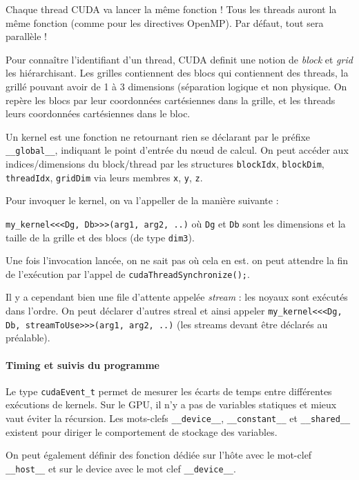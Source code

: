 \documentclass{article}
\begin{document}
Chaque thread CUDA va lancer la même fonction ! Tous les threads auront la même fonction (comme pour les directives OpenMP). Par défaut, tout sera parallèle !

Pour connaître l'identifiant d'un thread, CUDA definit une notion de \emph{block} et \emph{grid} les hiérarchisant. Les grilles contiennent des blocs qui contiennent des threads, la grillé pouvant avoir de 1 à 3 dimensions (séparation logique et non physique. On repère les blocs par leur coordonnées cartésiennes dans la grille, et les threads leurs coordonnées cartésiennes dans le bloc.

Un kernel est une fonction ne retournant rien se déclarant par le préfixe \texttt{\_\_global\_\_}, indiquant le point d'entrée du nœud de calcul. On peut accéder aux indices/dimensions du block/thread par les structures \texttt{blockIdx}, \texttt{blockDim}, \texttt{threadIdx}, \texttt{gridDim} via leurs membres \texttt{x}, \texttt{y}, \texttt{z}.

Pour invoquer le kernel, on va l'appeller de la manière suivante :

\texttt{my\_kernel<<<Dg, Db>>>(arg1, arg2, ..)} où \texttt{Dg} et \texttt{Db} sont les dimensions et la taille de la grille et des blocs (de type \texttt{dim3}).

Une fois l'invocation lancée, on ne sait pas où cela en est. on peut attendre la fin de l'exécution par l'appel de \texttt{cudaThreadSynchronize();}.

Il y a cependant bien une file d'attente appelée \emph{stream} : les noyaux sont exécutés dans l'ordre. On peut déclarer d'autres streal et ainsi appeler \texttt{my\_kernel<<<Dg, Db, streamToUse>>>(arg1, arg2, ..)} (les streams devant être déclarés au préalable).

\paragraph{Timing et suivis du programme}
Le type \texttt{cudaEvent\_t} permet de mesurer les écarts de temps entre différentes exécutions de kernels. Sur le GPU, il n'y a pas de variables statiques et mieux vaut éviter la récursion. Les mots-clefs \texttt{\_\_device\_\_}, \texttt{\_\_constant\_\_} et \texttt{\_\_shared\_\_} existent pour diriger le comportement de stockage des variables.


On peut également définir des fonction dédiée sur l'hôte avec le mot-clef \texttt{\_\_host\_\_} et sur le device avec le mot clef \texttt{\_\_device\_\_}.
\end{document}
